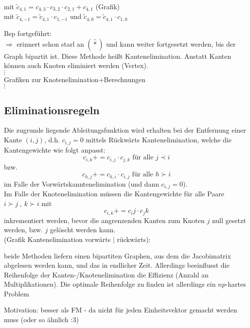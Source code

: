 \noindent
mit $\tilde{c}_{4,1}= c_{4,3}\cdot c_{3,2} \cdot c_{2,1} + c_{4,1}$
(Grafik)\\

\vspace{2cm}
mit $\tilde{c}_{4,-1} = \tilde{c}_{4,1}\cdot c_{1,-1}$ und $\tilde{c}_{4,0}=\tilde{c}_{4,1}\cdot c_{1,0}$

Bsp fortgeführt:\\
$\Rightarrow$ erinnert schon starl an $(\hat{*})$ und kann weiter fortgesetzt werden, bis der Graph bipartit ist. Diese Methode heißt Kantenelimination. Anstatt Kanten können auch Knoten eliminiert werden (Vertex).\\
$\vdots$\\
Grafiken zur Knotenelimination+Berechnungen\\
$\vdots$

\subsection{Eliminationsregeln}
Die zugrunde liegende Ableitungsfunktion wird erhalten bei der Entfernung einer Kante $(i,j)$, d.h. $c_{i,j}=0$ mittels Rückwärts Kantenelimination, welche die Kantengewichte wie folgt anpasst:
$$c_{i,k} += c_{i,j}\cdot c_{j,k} \text{ für alle } j\prec i$$
bzw.
$$c_{h,j} += c_{h,i}\cdot c_{i,j} \text{ für alle } h \succ i $$
im Falle der Vorwärtskanntenelimination (und dann $c_{i,j} =0$).\\
Im Falle der Knotenelimination müssen die Kantengewichte für alle Paare $i\succ j\ ,\ k\succ i$ mit 
$$ c_{i,k}+=c_ij\cdot c_jk$$
inkrementiert werden, bevor die angrenzenden Kanten zum Knoten $j$ null gesetzt werden, bzw. $j$ gelöscht werden kann.\\
(Grafik Kantenelimination vorwärts $|$ rückwärts):\\

\vspace{4cm}


beide Methoden liefern einen bipartiten Graphen, aus dem die Jacobimatrix abgelesen werden kann, und das in endlicher Zeit. Allerdings beeinflusst die Reihenfolge der Kanten-/Knotenelimination die Effizienz (Anzahl an Multiplikationen). Die optimale Reihenfolge zu finden ist allerdings ein $np$-hartes Problem

Motivation: besser als FM - da nicht für jeden Einheitsvektor gemacht werden muss (oder so ähnlich :3)